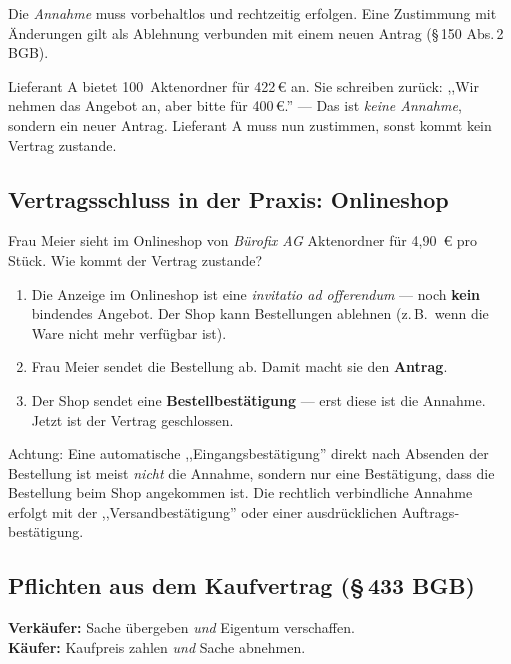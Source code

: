 \documentclass[11pt, a4paper]{article}
\begin{document}
Die \emph{Annahme} muss vorbehaltlos und rechtzeitig erfolgen. Eine Zustimmung mit
Änderungen gilt als Ablehnung verbunden mit einem neuen Antrag (§\,150 Abs.\,2 BGB).

\begin{beispiel}
Lieferant A bietet 100~Aktenordner für 422\,€ an. Sie schreiben zurück: ,,Wir nehmen
das Angebot an, aber bitte für 400\,€.'' --- Das ist \emph{keine Annahme}, sondern ein
neuer Antrag. Lieferant A muss nun zustimmen, sonst kommt kein Vertrag zustande.
\end{beispiel}

\subsection{Vertragsschluss in der Praxis: Onlineshop}

Frau Meier sieht im Onlineshop von \emph{Bürofix AG} Aktenordner für 4{,}90~€ pro Stück.
Wie kommt der Vertrag zustande?

\begin{enumerate}
  \item Die Anzeige im Onlineshop ist eine \emph{invitatio ad offerendum} --- noch
    \textbf{kein} bindendes Angebot. Der Shop kann Bestellungen ablehnen
    (z.\,B.\ wenn die Ware nicht mehr verfügbar ist).
  \item Frau Meier sendet die Bestellung ab. Damit macht sie den \textbf{Antrag}.
  \item Der Shop sendet eine \textbf{Bestellbestätigung} --- erst diese ist die
    Annahme. Jetzt ist der Vertrag geschlossen.
\end{enumerate}

Achtung: Eine automatische ,,Eingangs­bestätigung'' direkt nach Absenden der Bestellung
ist meist \emph{nicht} die Annahme, sondern nur eine Bestätigung, dass die Bestellung
beim Shop angekommen ist. Die rechtlich verbindliche Annahme erfolgt mit der
,,Versand­bestätigung'' oder einer ausdrücklichen Auftrags­bestätigung.

\subsection{Pflichten aus dem Kaufvertrag (§\,433 BGB)}

\begin{merksatz}[title={§\,433 BGB --- die Hauptpflichten}]
\textbf{Verkäufer:} Sache übergeben \emph{und} Eigentum verschaffen.\\
\textbf{Käufer:} Kaufpreis zahlen \emph{und} Sache abnehmen.
\end{merksatz}
\end{document}
